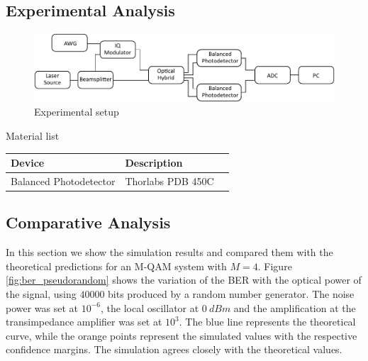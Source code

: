 \subsection*{Experimental Analysis}
\begin{figure}[H]
	\centering
	\includegraphics[width=\textwidth]{./sdf/m_qam_system/figures/mqamExperimental.pdf}
	\caption{Experimental setup}
	\label{fig:experimental_mqam_setup}
\end{figure}
%
%
Material list
\begin{table}[H]
	\centering
	\begin{tabulary}{1.0\textwidth}{|L|L|l|}
		\hline
		\textbf{Device}		& \textbf{Description}\\
		\hline
		Balanced Photodetector	& Thorlabs PDB 450C\\
		\hline
		\hline
		\hline
		\hline
		\hline
		\hline
		\hline
	\end{tabulary}
\end{table}


\subsection{Comparative Analysis}

In this section we show the simulation results and compared them with the theoretical predictions for an M-QAM system with $M=4$. Figure \ref{fig:ber_pseudorandom} shows the variation of the BER with the optical power of the signal, using $40000$ bits produced by a random number generator. The noise power was set at $10^{-6}$, the local oscillator at $0~dBm$ and the amplification at the transimpedance amplifier was set at $10^3$.
The blue line represents the theoretical curve, while the orange points represent the simulated values with the respective confidence margins. The simulation agrees closely with the theoretical values.

